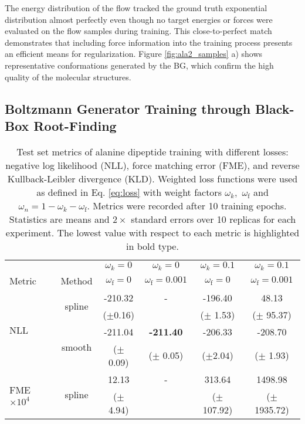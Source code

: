 \documentclass{article}
\begin{document}
The energy distribution of the flow tracked the ground truth exponential distribution almost perfectly even though no target energies or forces were evaluated on the flow samples during training. This close-to-perfect match demonstrates that including force information into the training process presents an efficient means for regularization. 
Figure \ref{fig:ala2_samples} a) shows representative conformations generated by the BG, which confirm the high quality of the molecular structures.


\subsection{Boltzmann Generator Training through Black-Box Root-Finding}

\begin{table}[htbp]
    \centering
    \caption{Test set metrics of alanine dipeptide training with different losses: negative log likelihood (NLL), force matching error (FME), and reverse Kullback-Leibler divergence (KLD). Weighted loss functions were used as defined in Eq. \eqref{eq:loss} with weight factors $\omega_k,$ $\omega_{\mathrm{f}}$ and $\omega_n = 1-\omega_k-\omega_{\mathrm{f}}.$ Metrics were recorded after 10 training epochs. Statistics are means and $2\times$ standard errors over 10 replicas for each experiment. The lowest value with respect to each metric is highlighted in bold type.
    } 
    \label{tab:metrics}
    \begin{tabular}{lccccc}
    \toprule
     &   &
     $\omega_{k}=0$ & $\omega_{k}=0$ & $\omega_{k}=0.1$ & $\omega_{k}=0.1$ \\
     Metric & Method & $\omega_{\mathrm{f}}=0$ & $\omega_{\mathrm{f}}=0.001$ & $\omega_{\mathrm{f}}=0$ & $\omega_{\mathrm{f}}=0.001$ \\
    \midrule
        \multirow{4}{*}{NLL} & \multirow{2}{*}{spline} & -210.32  & - & -196.40  & 48.13    \\
        & & ($\pm$0.16) & & ($\pm$ 1.53) & ($\pm$ 95.37) \\
        \cmidrule(lr){2-6}
           & \multirow{2}{*}{smooth} & -211.04 & \textbf{-211.40} & -206.33  & -208.70  \\
        & & ($\pm$ 0.09) &  ($\pm$ 0.05) & ($\pm 2.04$) & ($\pm$ 1.93)  \\
        \cmidrule(lr){2-6}
        \multirow{4}{*}{FME $\times 10^4$}  & \multirow{2}{*}{spline} & 12.13  & - &  313.64  & 1498.98 \\
        & & ($\pm$ 4.94) & & ($\pm$ 107.92) & ($\pm$ 1935.72)  \\

\end{tabular}
\end{table}
\end{document}
